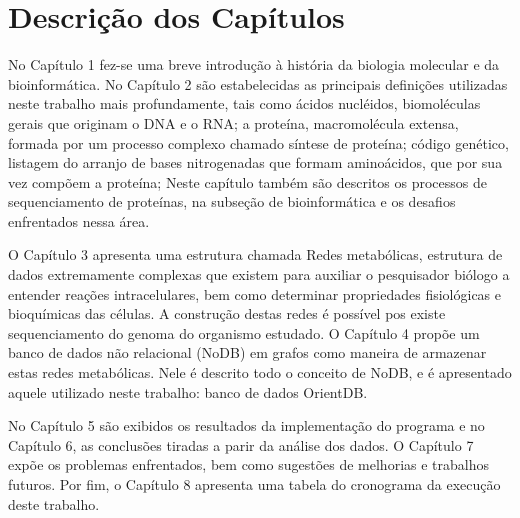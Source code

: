 \section{Descrição dos Capítulos}

\indent No Capítulo 1 fez-se uma breve introdução à história da biologia molecular e da bioinformática. No Capítulo 2 são estabelecidas as principais definições utilizadas neste trabalho mais profundamente, tais como ácidos nucléidos, biomoléculas gerais que originam o DNA e o RNA; a proteína, macromolécula extensa, formada por um processo complexo chamado síntese de proteína; código genético, listagem do arranjo de bases nitrogenadas que formam aminoácidos, que por sua vez compõem a proteína; Neste capítulo também são descritos os processos de sequenciamento de proteínas, na subseção de bioinformática e os desafios enfrentados nessa área.

\indent O Capítulo 3 apresenta uma estrutura chamada Redes metabólicas, estrutura de dados extremamente complexas que existem para auxiliar o pesquisador biólogo a entender reações intracelulares, bem como determinar propriedades fisiológicas e bioquímicas das células. A construção destas redes é possível pos existe sequenciamento do genoma do organismo estudado. O Capítulo 4 propõe um banco de dados não relacional (NoDB) em grafos como maneira de armazenar estas redes metabólicas. Nele é descrito todo o conceito de NoDB, e é apresentado aquele utilizado neste trabalho: banco de dados OrientDB.

\indent No Capítulo 5 são exibidos os resultados da implementação do programa e no Capítulo 6, as conclusões tiradas a parir da análise dos dados. O Capítulo 7 expõe os problemas enfrentados, bem como sugestões de melhorias e trabalhos futuros. Por fim, o Capítulo 8 apresenta uma tabela do cronograma da execução deste trabalho.






